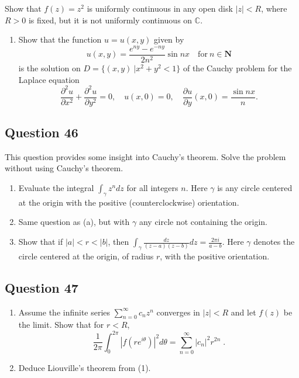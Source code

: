 \documentclass[12pt]{article}
\providecommand{\tightlist}{%
  \setlength{\itemsep}{0pt}\setlength{\parskip}{0pt}}
\begin{document}
Show that \(f(z) = z^2\) is uniformly continuous in any open disk
\(|z| < R\), where \(R>0\) is fixed, but it is not uniformly continuous
on \(\mathbb C\).

\begin{enumerate}
\def\labelenumi{(\arabic{enumi})}
\tightlist
\item
  Show that the function \(u=u(x,y)\) given by
  \[u(x,y)=\frac{e^{ny}-e^{-ny}}{2n^2}\sin nx\quad \text{for}\ n\in {\mathbf N}\]
  is the solution on \(D=\{(x,y)\ | x^2+y^2<1\}\) of the Cauchy problem
  for the Laplace equation
  \[\frac{\partial ^2u}{\partial x^2}+\frac{\partial ^2u}{\partial y^2}=0,\quad
  u(x,0)=0,\quad \frac{\partial u}{\partial y}(x,0)=\frac{\sin nx}{n}.\]
\end{enumerate}

\hypertarget{question-46-2}{%
\subsection{Question 46}\label{question-46-2}}

This question provides some insight into Cauchy's theorem. Solve the
problem without using Cauchy's theorem.

\begin{enumerate}
\def\labelenumi{\arabic{enumi}.}
\item
  Evaluate the integral \(\displaystyle{\int_{\gamma} z^n dz}\) for all
  integers \(n\). Here \(\gamma\) is any circle centered at the origin
  with the positive (counterclockwise) orientation.
\item
  Same question as (a), but with \(\gamma\) any circle not containing
  the origin.
\item
  Show that if \(|a|<r<|b|\), then
  \(\displaystyle{\int_{\gamma}\frac{dz}{(z-a)(z-b)} dz=\frac{2\pi i}{a-b}}\).
  Here \(\gamma\) denotes the circle centered at the origin, of radius
  \(r\), with the positive orientation.
\end{enumerate}

\hypertarget{question-47-2}{%
\subsection{Question 47}\label{question-47-2}}

\begin{enumerate}
\def\labelenumi{(\arabic{enumi})}
\item
  Assume the infinite series \(\displaystyle \sum_{n=0}^\infty c_n z^n\)
  converges in \(|z| < R\) and let \(f(z)\) be the limit. Show that for
  \(r <R\),
  \[\frac{1}{2 \pi} \int_0^{2 \pi} |f(r e^{i \theta})|^2 d \theta =
  \sum_{n=0}^\infty |c_n|^2 r^{2n} \; .\]
\item
  Deduce Liouville's theorem from (1).
\end{enumerate}
\end{document}
